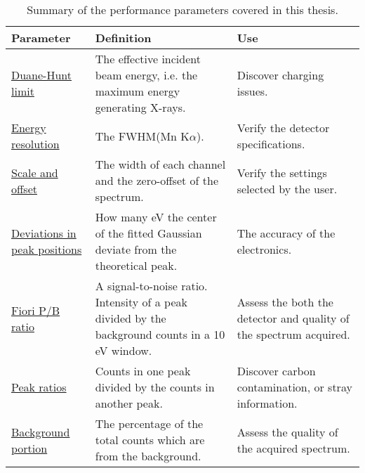 \begin{table}[htp]
    \centering
    \caption{
        Summary of the performance parameters covered in this thesis.
    }
    \renewcommand*{\arraystretch}{1.4}
    \label{tab:eds_performance_parameters}
    \begin{tabular}{p{2.6cm}p{5cm}p{5cm}}
        \textbf{Parameter}                                                            & \textbf{Definition}                                                                              & \textbf{Use}                                                       \\
        \hline
        \hyperref[theory:eds_performance:duanehunt]{Duane-Hunt limit}                 & The effective incident beam energy, i.e. the maximum energy generating X-rays.                   & Discover charging issues.                                          \\
        \hyperref[theory:eds_performance:energyres]{Energy resolution}                & The FWHM(Mn K$\alpha$).                                                                          & Verify the detector specifications.                                \\
        \hyperref[theory:eds_performance:scaleoffset]{Scale and offset}               & The width of each channel and the zero-offset of the spectrum.                                   & Verify the settings selected by the user.                          \\
        \hyperref[theory:eds_performance:peakpositions]{Deviations in peak positions} & How many eV the center of the fitted Gaussian deviate from the theoretical peak.                 & The accuracy of the electronics.                                   \\
        \hyperref[theory:eds_performance:fiori]{Fiori P/B ratio}                      & A signal-to-noise ratio. Intensity of a peak divided by the background counts in a 10 eV window. & Assess the both the detector and quality of the spectrum acquired. \\
        \hyperref[theory:eds_performance:peakratio]{Peak ratios}                      & Counts in one peak divided by the counts in another peak.                                        & Discover carbon contamination, or stray information.               \\
        \hyperref[theory:eds_performance:bacgrkound_portion]{Background portion}      & The percentage of the total counts which are from the background.                                & Assess the quality of the acquired spectrum.
    \end{tabular}
\end{table}